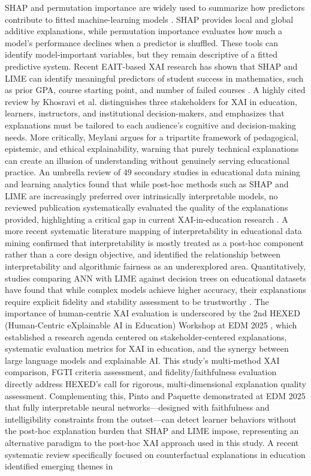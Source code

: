 \documentclass[pdflatex,sn-mathphys-ay]{sn-jnl}
\begin{document}
SHAP and permutation importance are widely used to summarize how predictors contribute to fitted machine-learning models \citep{Lundberg_Lee_2017,Molnar_2022}. SHAP provides local and global additive explanations, while permutation importance evaluates how much a model's performance declines when a predictor is shuffled. These tools can identify model-important variables, but they remain descriptive of a fitted predictive system. Recent EAIT-based XAI research has shown that SHAP and LIME can identify meaningful predictors of student success in mathematics, such as prior GPA, course starting point, and number of failed courses \citep{Mgonja_2024}. A highly cited review by Khosravi et al. \citep{Khosravi_2022} distinguishes three stakeholders for XAI in education, learners, instructors, and institutional decision-makers, and emphasizes that explanations must be tailored to each audience's cognitive and decision-making needs. More critically, Meylani \citep{Meylani_2025} argues for a tripartite framework of pedagogical, epistemic, and ethical explainability, warning that purely technical explanations can create an illusion of understanding without genuinely serving educational practice. An umbrella review of 49 secondary studies in educational data mining and learning analytics found that while post-hoc methods such as SHAP and LIME are increasingly preferred over intrinsically interpretable models, no reviewed publication systematically evaluated the quality of the explanations provided, highlighting a critical gap in current XAI-in-education research \citep{Gunasekara_Saarela_2024}. A more recent systematic literature mapping of interpretability in educational data mining \citep{Carvalho_2026_SLM} confirmed that interpretability is mostly treated as a post-hoc component rather than a core design objective, and identified the relationship between interpretability and algorithmic fairness as an underexplored area. Quantitatively, studies comparing ANN with LIME against decision trees on educational datasets have found that while complex models achieve higher accuracy, their explanations require explicit fidelity and stability assessment to be trustworthy \citep{Gunasekara_Saarela_2025_quant_xai}. The importance of human-centric XAI evaluation is underscored by the 2nd HEXED (Human-Centric eXplainable AI in Education) Workshop at EDM 2025 \citep{HEXED_2025_workshop}, which established a research agenda centered on stakeholder-centered explanations, systematic evaluation metrics for XAI in education, and the synergy between large language models and explainable AI. This study's multi-method XAI comparison, FGTI criteria assessment, and fidelity/faithfulness evaluation directly address HEXED's call for rigorous, multi-dimensional explanation quality assessment. Complementing this, Pinto and Paquette \citep{Pinto_Paquette_2025_EDM} demonstrated at EDM 2025 that fully interpretable neural networks---designed with faithfulness and intelligibility constraints from the outset---can detect learner behaviors without the post-hoc explanation burden that SHAP and LIME impose, representing an alternative paradigm to the post-hoc XAI approach used in this study. A recent systematic review specifically focused on counterfactual explanations in education identified emerging themes in 
\end{document}
